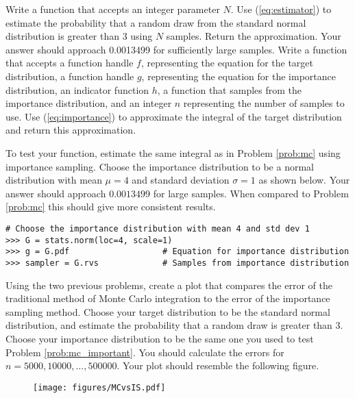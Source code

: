  \label{prob:mc}
Write a function that accepts an integer parameter $N$.
Use (\ref{eq:estimator}) to estimate the probability that a random draw from the standard normal distribution is greater than $3$ using $N$ samples.
Return the approximation.
Your answer should approach 0.0013499 for sufficiently large samples.
 \label{prob:mc_important}
Write a function that accepts a function handle $f$, representing the equation for the target distribution, a function handle $g$, representing the equation for the importance distribution, an indicator function $h$, a function that samples from the importance distribution, and an integer $n$ representing the number of samples to use.
Use (\ref{eq:importance}) to approximate the integral of the target distribution and return this approximation.

To test your function, estimate the same integral as in Problem \ref{prob:mc} using importance sampling.
Choose the importance distribution to be a normal distribution with mean $\mu = 4$ and standard deviation $\sigma = 1$ as shown below.
Your answer should approach $0.0013499$ for large samples.
When compared to Problem \ref{prob:mc} this should give more consistent results.

\begin{lstlisting}
# Choose the importance distribution with mean 4 and std dev 1
>>> G = stats.norm(loc=4, scale=1)
>>> g = G.pdf                   # Equation for importance distribution
>>> sampler = G.rvs             # Samples from importance distribution
\end{lstlisting}

 \label{prob:mc_is_compare}
Using the two previous problems, create a plot that compares the error of the traditional method of Monte Carlo integration to the error of the importance sampling method.
Choose your target distribution to be the standard normal distribution, and estimate the probability that a random draw is greater than $3$.
Choose your importance distribution to be the same one you used to test Problem \ref{prob:mc_important}.
You should calculate the errors for $n = 5000, 10000, \ldots , 500000$.
Your plot should resemble the following figure.

\begin{figure}[H]
\texttt{[image: figures/MCvsIS.pdf]}
\label{fig:compare}
\end{figure}

